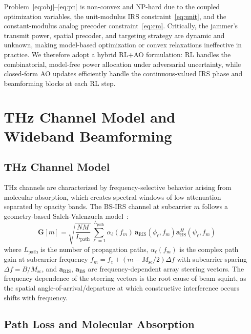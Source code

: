 \documentclass[journal,twocolumn]{IEEEtran}
\newcommand{\vect}[1]{\mathbf{#1}}
\newcommand{\mat}[1]{\mathbf{#1}}
\begin{document}
Problem~\eqref{eq:obj}--\eqref{eq:pn} is non-convex and NP-hard due to the coupled optimization variables, the unit-modulus IRS constraint~\eqref{eq:unit}, and the constant-modulus analog precoder constraint~\eqref{eq:cm}. Critically, the jammer's transmit power, spatial precoder, and targeting strategy are dynamic and unknown, making model-based optimization or convex relaxations ineffective in practice. We therefore adopt a hybrid RL+AO formulation: RL handles the combinatorial, model-free power allocation under adversarial uncertainty, while closed-form AO updates efficiently handle the continuous-valued IRS phase and beamforming blocks at each RL step.

\section{THz Channel Model and Wideband Beamforming}
\label{sec:thz}

\subsection{THz Channel Model}

THz channels are characterized by frequency-selective behavior arising from molecular absorption, which creates spectral windows of low attenuation separated by opacity bands. The BS-IRS channel at subcarrier $m$ follows a geometry-based Saleh-Valenzuela model~\cite{su2023wideband}:
\begin{equation}
\mat{G}[m] = \sqrt{\frac{N M}{L_{\text{path}}}} \sum_{\ell=1}^{L_{\text{path}}} \alpha_\ell(f_m)\, \vect{a}_{\text{RIS}}(\phi_\ell, f_m) \vect{a}_{\text{BS}}^H(\psi_\ell, f_m)
\label{eq:thz_channel}
\end{equation}
where $L_{\text{path}}$ is the number of propagation paths, $\alpha_\ell(f_m)$ is the complex path gain at subcarrier frequency $f_m = f_c + (m - M_{\text{sc}}/2)\Delta f$ with subcarrier spacing $\Delta f = B/M_{\text{sc}}$, and $\vect{a}_{\text{RIS}}$, $\vect{a}_{\text{BS}}$ are frequency-dependent array steering vectors. The frequency dependence of the steering vectors is the root cause of beam squint, as the spatial angle-of-arrival/departure at which constructive interference occurs shifts with frequency.

\subsection{Path Loss and Molecular Absorption}
\end{document}
